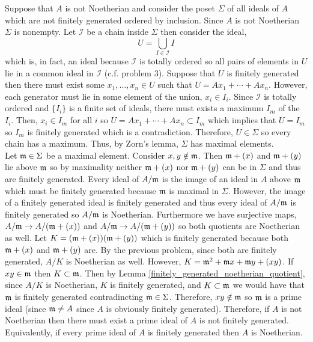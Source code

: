 \documentclass[12pt]{extarticle}
\begin{document}
Suppose that $A$ is not Noetherian and consider the poset $\Sigma$ of all ideals of $A$ which are not finitely generated ordered by inclusion. Since $A$ is not Noetherian $\Sigma$ is nonempty. Let $\mathcal{I}$ be a chain inside $\Sigma$ then consider the ideal,
\[ U = \bigcup_{I \in \mathcal{I}} I \]
which is, in fact, an ideal because $\mathcal{I}$ is totally ordered so all pairs of elements in $U$ lie in a common ideal in $\mathcal{I}$ (c.f. problem 3). Suppose that $U$ is finitely generated then there must exist some $x_1, \dots, x_n \in U$ such that $U = A x_1 + \cdots + A x_n$. However, each generator must lie in some element of the union, $x_i \in I_i$. Since $\mathcal{I}$ is totally ordered and $\{ I_i \}$ is a finite set of ideals, there must exists a maximum $I_m$ of the $I_i$. Then, $x_i \in I_m$ for all $i$ so $U = A x_1 + \cdots + A x_n \subset I_m$ which implies that $U = I_m$ so $I_m$ is finitely generated which is a contradiction. Therefore, $U \in \Sigma$ so every chain has a maximum. Thus, by Zorn's lemma, $\Sigma$ has maximal elements.
\bigskip\\
Let $\mathfrak{m} \in \Sigma$ be a maximal element. Consider $x,y \notin \mathfrak{m}$. Then $\mathfrak{m} + (x)$ and $\mathfrak{m} + (y)$ lie above $\mathfrak{m}$ so by maximality neither $\mathfrak{m} + (x)$ nor $\mathfrak{m} + (y)$ can be in $\Sigma$ and thus are finitely generated. Every ideal of $A / \mathfrak{m}$ is the image of an ideal in $A$ above $\mathfrak{m}$ which must be finitely generated because $\mathfrak{m}$ is maximal in $\Sigma$. However, the image of a finitely generated ideal is finitely generated and thus every ideal of $A / \mathfrak{m}$ is finitely generated so $A / \mathfrak{m}$ is Noetherian. Furthermore we have surjective maps, $A / \mathfrak{m} \to A / (\mathfrak{m} + (x))$ and $A / \mathfrak{m} \to A / (\mathfrak{m} + (y))$ so both quotients are Noetherian as well. Let $K = (\mathfrak{m} + (x))(\mathfrak{m} + (y))$ which is finitely generated because both $\mathfrak{m} + (x)$ and $\mathfrak{m} + (y)$ are. By the previous problem, since both are finitely generated, $A / K$ is Noetherian as well. However, $K = \mathfrak{m}^2 + \mathfrak{m} x + \mathfrak{m} y + (x y)$. If $xy \in \mathfrak{m}$ then $K \subset \mathfrak{m}$. Then by Lemma \ref{finitely_generated_noetherian_quotient}, since $A / K$ is Noetherian, $K$ is finitely generated, and $K \subset \mathfrak{m}$ we would have that $\mathfrak{m}$ is finitely generated contradincting $\mathfrak{m} \in \Sigma$. Therefore, $xy \notin \mathfrak{m}$ so $\mathfrak{m}$ is a prime ideal (since $\mathfrak{m} \neq A$ since $A$ is obviously finitely generated). Therefore, if $A$ is not Noetherian then there must exist a prime ideal of $A$ is not finitely generated. Equivalently, if every prime ideal of $A$ is finitely generated then $A$ is Noetherian.       
\end{document}
